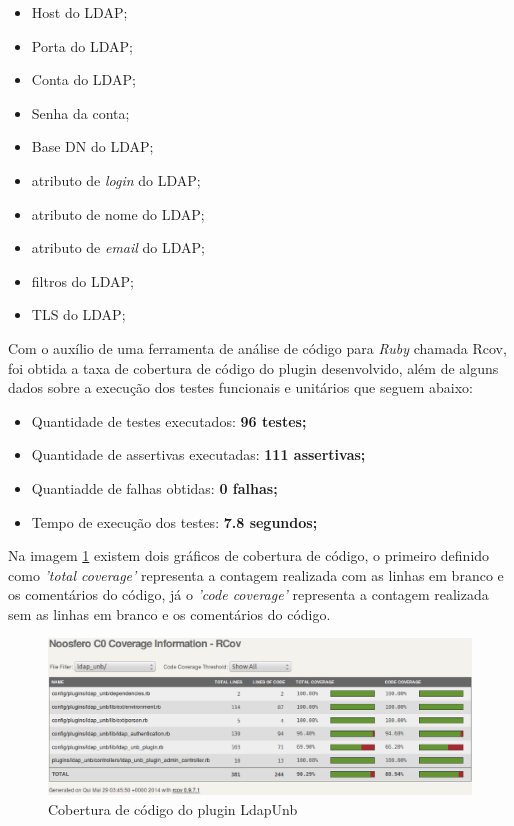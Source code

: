 \begin{itemize}
\item Host do LDAP;
\item Porta do LDAP;
\item Conta do LDAP;
\item Senha da conta;
\item Base DN do LDAP;
\item atributo de \textit{login} do LDAP;
\item atributo de nome do LDAP;
\item atributo de \textit{email} do LDAP;
\item filtros do LDAP;
\item TLS do LDAP;
\end{itemize}

 Com o auxílio de uma ferramenta de análise de código para \textit{Ruby} chamada Rcov, foi obtida a taxa de cobertura de código do plugin desenvolvido, além de alguns dados sobre a execução dos testes funcionais e unitários que seguem abaixo:

\begin{itemize}
\item Quantidade de testes executados: \textbf{96 testes;}
\item Quantidade de assertivas executadas: \textbf{111 assertivas;}
\item Quantiadde de falhas obtidas: \textbf{0 falhas;}
\item Tempo de execução dos testes: \textbf{7.8 segundos;}
\end{itemize}

Na imagem \ref{consideracoes_cobertura1} existem dois gráficos de cobertura de código, o primeiro definido como \textit{'total coverage'} representa a contagem realizada com as linhas em branco e os comentários do código, já o \textit{'code coverage'} representa a contagem realizada sem as linhas em branco e os comentários do código.


\begin{figure}[!h]
    \centering
    \includegraphics[keepaspectratio=false,scale=0.45]
      {figuras/cobertura_teste.eps}
    \caption{Cobertura de código do plugin LdapUnb}
    \label{consideracoes_cobertura1}
\end{figure}


